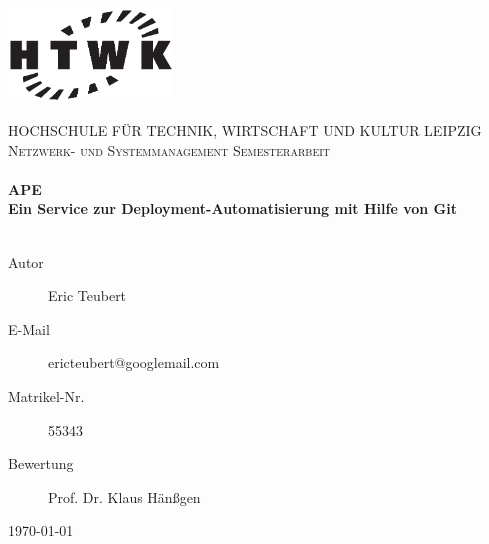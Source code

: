 \begin{titlepage}

  \begin{center}

    \thispagestyle{empty} 

    \includegraphics[height=25mm]{assets/HTWK.eps}

    \textsc{\LARGE HOCHSCHULE FÜR TECHNIK, WIRTSCHAFT UND KULTUR LEIPZIG}\\[1cm]

    \textsc{\LARGE \color{grey} Netzwerk- und Systemmanagement Semesterarbeit}\\[1cm]

    \HRule \\[0.4cm]
      {
        \huge \bfseries APE \\[0.4cm]
        \large Ein Service zur Deployment-Automatisierung mit Hilfe von Git
      }\\[0.4cm]
    \HRule \\[1.5cm]

    \begin{minipage}{0.85\textwidth}
      \begin{flushleft}
        \color{grey}
        \begin{description}
          \item [Autor]         \hfill Eric Teubert
          \item [E-Mail]        \hfill ericteubert@googlemail.com
          \item [Matrikel-Nr.]  \hfill 55343
          \item [Bewertung]     \hfill Prof. Dr. Klaus Hänßgen
        \end{description}
      \end{flushleft}
    \end{minipage}

    \vfill
    {\large \today}

  \end{center}
\end{titlepage}